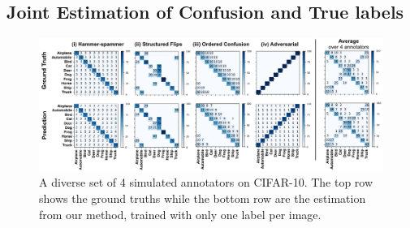 \subsection{Joint Estimation of Confusion and True labels}
\begin{figure}[h]
    \begin{center}
		\includegraphics[width=\linewidth]{chapter_4/figures/figure_cifar10_visualization_of_confusion_matrices_03.png}
	\end{center}
	\vspace{-6mm}
	\caption{\small A diverse set of 4 simulated annotators on CIFAR-10. The top row shows the ground truths while the bottom row are the estimation from our method, trained with only one label per image. }
	 \label{fig:recover_cms}
\end{figure}

